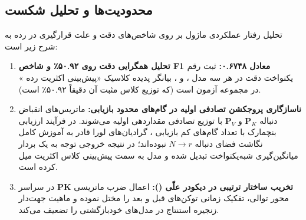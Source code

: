 \subsection{محدودیت‌ها و تحلیل شکست}
تحلیل رفتار عملکردی ماژول بر روی شاخص‌های دقت و علت قرارگیری در رده  به شرح زیر است:
\begin{enumerate}
    \item \textbf{تحلیل همگرایی دقت روی ۵۰.۹۲٪ و شاخص F1 معادل ۰.۶۷۴۸:} ثبت رقم یکنواخت دقت  در هر سه مدل ،  و ، بیانگر پدیده کلاسیک «پیش‌بینی اکثریت رده » در مجموعه آزمون  است (که توزیع کلاس مثبت آن دقیقاً ۵۰.۹۲٪ است).
    \item \textbf{ناسازگاری پروجکشن تصادفی اولیه در گام‌های محدود بازیابی:} ماتریس‌های انقباض دنباله $\mathbf{P}_K$ و $\mathbf{P}_V$ با توزیع تصادفی مقداردهی اولیه می‌شوند. در فرآیند ارزیابی بنچمارک با تعداد گام‌های کم بازیابی ، گرادیان‌های لورا قادر به آموزش کامل نگاشت فضای دنباله $N \to r$ نبوده‌اند؛ در نتیجه خروجی توجه به یک بردار میانگین‌گیری شبه‌یکنواخت تبدیل شده و مدل به سمت پیش‌بینی کلاس اکثریت میل کرده است.
    \item \textbf{تخریب ساختار ترتیبی در دیکودر علّی ():} اعمال ضرب ماتریسی $\mathbf{P} \mathbf{K}$ در سراسر محور توالی، تفکیک زمانی توکن‌های قبل و بعد را مختل نموده و ماهیت جهت‌دار زنجیره استنتاج در مدل‌های خودبازگشتی را تضعیف می‌کند.
\end{enumerate}
